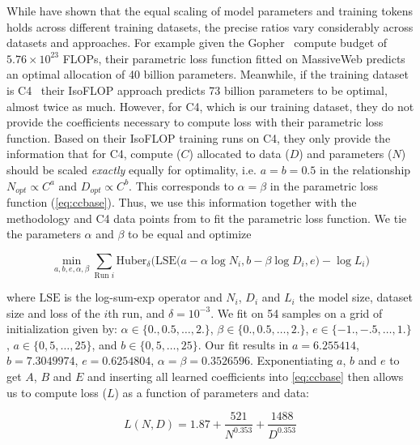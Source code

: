 \documentclass{article}
\begin{document}
While \citet{hoffmann2022training} have shown that the equal scaling of model parameters and training tokens holds across different training datasets, the precise ratios vary considerably across datasets and approaches. For example given the Gopher~\cite{rae2021scaling} compute budget of $5.76 \times 10^{23}$ FLOPs, their parametric loss function fitted on MassiveWeb predicts an optimal allocation of 40 billion parameters. Meanwhile, if the training dataset is C4~\cite{raffel2020exploring} their IsoFLOP approach predicts 73 billion parameters to be optimal, almost twice as much. However, for C4, which is our training dataset, they do not provide the coefficients necessary to compute loss with their parametric loss function. Based on their IsoFLOP training runs on C4, they only provide the information that for C4, compute ($C$) allocated to data ($D$) and parameters ($N$) should be scaled \emph{exactly} equally for optimality, i.e. $a=b=0.5$ in the relationship $N_{opt} \propto C^a$ and $D_{opt} \propto C^b$. This corresponds to $\alpha=\beta$ in the parametric loss function (\autoref{eq:ccbase}). Thus, we use this information together with the methodology and C4 data points from \cite{hoffmann2022training} to fit the parametric loss function. We tie the parameters $\alpha$ and $\beta$ to be equal and optimize

\begin{equation}\label{eq:lse}
     \min_{a, b, e, \alpha, \beta}  \sum_{\text{Run }i} \text{Huber}_\delta \Big(\text{LSE}\big(a - \alpha \log N_i, b- \beta \log D_i, e \big) - \log L_i\Big)
\end{equation}

where $\text{LSE}$ is the log-sum-exp operator and $N_i$, $D_i$ and $L_i$ the model size, dataset size and loss of the $i$th run, and $\delta = 10^{-3}$. We fit on 54 samples on a grid of initialization given by: $\alpha \in \{0., 0.5,\dots, 2. \}$, $\beta \in \{ 0., 0.5,\dots, 2.\}$, $e \in \{-1., -.5, \dots, 1. \}$, $a \in \{0, 5, \dots, 25 \}$, and $b \in \{0, 5, \dots, 25 \}$.
Our fit results in $a=6.255414$, $b=7.3049974$, $e=0.6254804$, $\alpha=\beta=0.3526596$. Exponentiating $a$, $b$ and $e$ to get $A$, $B$ and $E$ and inserting all learned coefficients into \autoref{eq:ccbase} then allows us to compute loss ($L$) as a function of parameters and data: 

\begin{equation}
    L(N, D) = 1.87 + \frac{521}{N^{0.353}} + \frac{1488}{D^{0.353}}
\end{equation}
\end{document}
